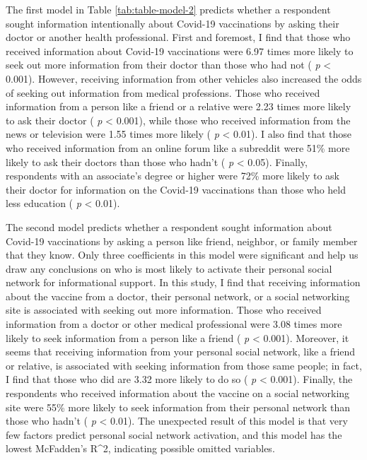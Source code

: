 The first model in Table \ref{tab:table-model-2} predicts whether a
respondent sought information intentionally about Covid-19 vaccinations by
asking their doctor or another health professional. First and foremost, I find
that those who received information about Covid-19 vaccinations were
6.97 times
more likely to seek out more information from their doctor than those who had
not ( \emph{p} \textless{} 0.001). However, receiving information from other vehicles also
increased the odds of seeking out information from medical professions. Those who
received information from a person like a friend or a relative were
2.23 times more likely to ask their doctor ( \emph{p} \textless{} 0.001), while those who received
information from the news or television were 1.55 times more likely ( \emph{p} \textless{} 0.01). I also find that those who received information from an online forum like a subreddit were 51\% more likely to ask their doctors than those who hadn't ( \emph{p} \textless{} 0.05). Finally, respondents with an associate's degree or higher were 72\%
more likely to ask their doctor for information on the Covid-19 vaccinations
than those who held less education ( \emph{p} \textless{} 0.01).

The second model predicts whether a respondent sought information about
Covid-19 vaccinations by asking a person like friend, neighbor, or family member
that they know. Only three coefficients in this model were significant and help
us draw any conclusions on who is most likely to activate their personal social
network for informational support. In this study, I find that receiving
information about the vaccine from a doctor, their personal network, or a social
networking site is associated with seeking out more information. Those who
received information from a doctor or other medical professional were 3.08
times more likely to seek information from a person like a friend ( \emph{p} \textless{} 0.001).
Moreover, it seems that receiving information from your personal social network,
like a friend or relative, is associated with seeking information from those
same people; in fact, I find that those who did are 3.32 more
likely to do so ( \emph{p} \textless{} 0.001). Finally, the respondents who received information
about the vaccine on a social networking site were 55\%
more likely to seek information from their personal network than those who hadn't
( \emph{p} \textless{} 0.01). The unexpected result of this model is that very few factors predict
personal social network activation, and this model has the lowest McFadden's R\^{}2,
indicating possible omitted variables.

